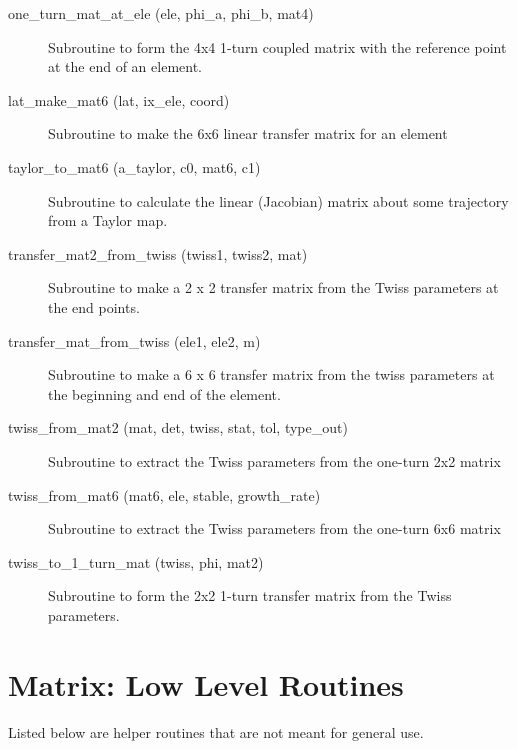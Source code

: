\begin{description}
\item[one_turn_mat_at_ele (ele, phi_a, phi_b, mat4)] \Newline
Subroutine to form the 4x4 1-turn coupled matrix with the reference point 
at the end of an element. 

\item[lat_make_mat6 (lat, ix_ele, coord)] \Newline
Subroutine to make the 6x6 linear transfer matrix for an element 

\item[taylor_to_mat6 (a_taylor, c0, mat6, c1)] \Newline
Subroutine to calculate the linear (Jacobian) matrix about some trajectory from a Taylor map. 

\item[transfer_mat2_from_twiss (twiss1, twiss2, mat)] \Newline
Subroutine to make a 2 x 2 transfer matrix from the Twiss parameters at the end points. 

\item[transfer_mat_from_twiss (ele1, ele2, m)] \Newline 
Subroutine to make a 6 x 6 transfer matrix from the twiss parameters
at the beginning and end of the element.

\item[twiss_from_mat2 (mat, det, twiss, stat, tol, type_out)] \Newline
Subroutine to extract the Twiss parameters from the one-turn 2x2 matrix 

\item[twiss_from_mat6 (mat6, ele, stable, growth_rate)] \Newline
Subroutine to extract the Twiss parameters from the one-turn 6x6 matrix 

\item[twiss_to_1_turn_mat (twiss, phi, mat2)] \Newline
Subroutine to form the 2x2 1-turn transfer matrix from the Twiss parameters. 

\end{description}

\section{Matrix: Low Level Routines}
\label{r:low.mat}  

Listed below are helper routines that are not meant for general use.

